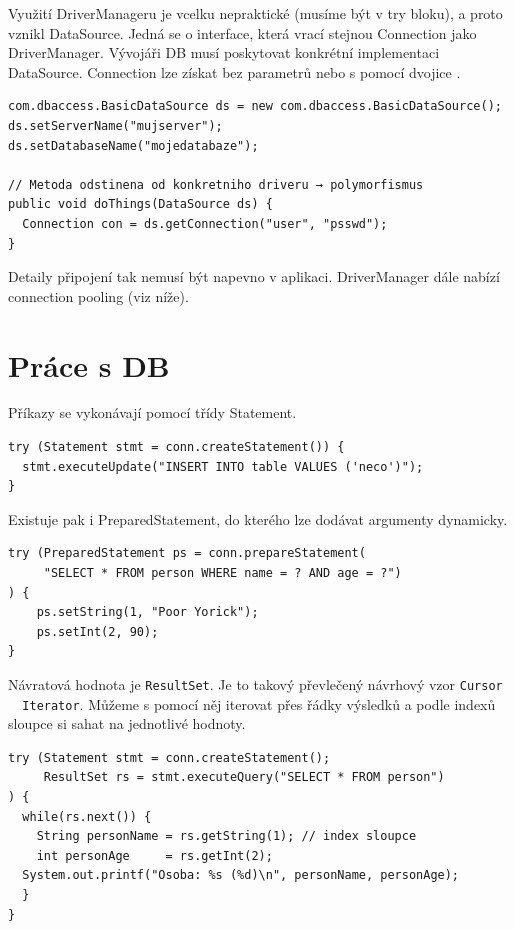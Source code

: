 \documentclass{szzclass}
\begin{document}
Využití DriverManageru je vcelku nepraktické (musíme být v try bloku), a proto vznikl DataSource. Jedná se o interface, která vrací stejnou Connection jako DriverManager. Vývojáři DB musí poskytovat konkrétní implementaci DataSource. Connection lze získat bez parametrů nebo s pomocí dvojice .

\begin{verbatim}
com.dbaccess.BasicDataSource ds = new com.dbaccess.BasicDataSource();
ds.setServerName("mujserver");
ds.setDatabaseName("mojedatabaze");

// Metoda odstinena od konkretniho driveru → polymorfismus
public void doThings(DataSource ds) {
  Connection con = ds.getConnection("user", "psswd");
}
\end{verbatim}

Detaily připojení tak nemusí být napevno v aplikaci. DriverManager dále nabízí connection pooling (viz níže).

\section{Práce s DB}
Příkazy se vykonávají pomocí třídy Statement.

\begin{verbatim}
try (Statement stmt = conn.createStatement()) {
  stmt.executeUpdate("INSERT INTO table VALUES ('neco')");
}
\end{verbatim}

Existuje pak i PreparedStatement, do kterého lze dodávat argumenty dynamicky.

\begin{verbatim}
try (PreparedStatement ps = conn.prepareStatement(
     "SELECT * FROM person WHERE name = ? AND age = ?")
) {
    ps.setString(1, "Poor Yorick");
    ps.setInt(2, 90);
}
\end{verbatim}

Návratová hodnota je \texttt{ResultSet}. Je to takový převlečený návrhový vzor \texttt{Cursor ~ Iterator}.
Můžeme s pomocí něj iterovat přes řádky výsledků a podle indexů sloupce si sahat na jednotlivé hodnoty.

\begin{verbatim}
try (Statement stmt = conn.createStatement();
     ResultSet rs = stmt.executeQuery("SELECT * FROM person")
) {
  while(rs.next()) {
    String personName = rs.getString(1); // index sloupce
    int personAge     = rs.getInt(2);
  System.out.printf("Osoba: %s (%d)\n", personName, personAge);
  }
}
\end{verbatim}
\end{document}
